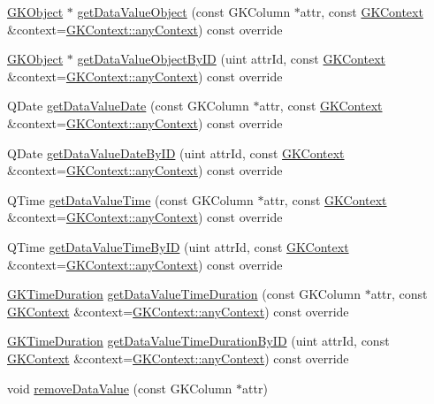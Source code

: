 \begin{DoxyCompactItemize}
\item 
\hyperlink{classGKObject}{G\+K\+Object} $\ast$ \hyperlink{classGKObject_a47e5fa225dbfce728bc1d45a9d742ab5}{get\+Data\+Value\+Object} (const G\+K\+Column $\ast$attr, const \hyperlink{classGKContext}{G\+K\+Context} \&context=\hyperlink{classGKContext_a37de2dc1b6bab087b9b92a445922e79d}{G\+K\+Context\+::any\+Context}) const override
\item 
\hyperlink{classGKObject}{G\+K\+Object} $\ast$ \hyperlink{classGKObject_a0107083f955e848f0e1af39f6a9e1263}{get\+Data\+Value\+Object\+By\+ID} (uint attr\+Id, const \hyperlink{classGKContext}{G\+K\+Context} \&context=\hyperlink{classGKContext_a37de2dc1b6bab087b9b92a445922e79d}{G\+K\+Context\+::any\+Context}) const override
\item 
Q\+Date \hyperlink{classGKObject_a89e18a58729aa19fc955ea56ca6d64e6}{get\+Data\+Value\+Date} (const G\+K\+Column $\ast$attr, const \hyperlink{classGKContext}{G\+K\+Context} \&context=\hyperlink{classGKContext_a37de2dc1b6bab087b9b92a445922e79d}{G\+K\+Context\+::any\+Context}) const override
\item 
Q\+Date \hyperlink{classGKObject_a16fd1ea80b037c2711afe5f481b05be0}{get\+Data\+Value\+Date\+By\+ID} (uint attr\+Id, const \hyperlink{classGKContext}{G\+K\+Context} \&context=\hyperlink{classGKContext_a37de2dc1b6bab087b9b92a445922e79d}{G\+K\+Context\+::any\+Context}) const override
\item 
Q\+Time \hyperlink{classGKObject_a5d819751b84c1070389f1de5272b2653}{get\+Data\+Value\+Time} (const G\+K\+Column $\ast$attr, const \hyperlink{classGKContext}{G\+K\+Context} \&context=\hyperlink{classGKContext_a37de2dc1b6bab087b9b92a445922e79d}{G\+K\+Context\+::any\+Context}) const override
\item 
Q\+Time \hyperlink{classGKObject_a5debfef84c5b0a056ea69808bb70bf38}{get\+Data\+Value\+Time\+By\+ID} (uint attr\+Id, const \hyperlink{classGKContext}{G\+K\+Context} \&context=\hyperlink{classGKContext_a37de2dc1b6bab087b9b92a445922e79d}{G\+K\+Context\+::any\+Context}) const override
\item 
\hyperlink{classGKTimeDuration}{G\+K\+Time\+Duration} \hyperlink{classGKObject_aff1ecee68193a30729f70ad5e1179e8b}{get\+Data\+Value\+Time\+Duration} (const G\+K\+Column $\ast$attr, const \hyperlink{classGKContext}{G\+K\+Context} \&context=\hyperlink{classGKContext_a37de2dc1b6bab087b9b92a445922e79d}{G\+K\+Context\+::any\+Context}) const override
\item 
\hyperlink{classGKTimeDuration}{G\+K\+Time\+Duration} \hyperlink{classGKObject_a2f659029f39e986a07632ee0ce85da9b}{get\+Data\+Value\+Time\+Duration\+By\+ID} (uint attr\+Id, const \hyperlink{classGKContext}{G\+K\+Context} \&context=\hyperlink{classGKContext_a37de2dc1b6bab087b9b92a445922e79d}{G\+K\+Context\+::any\+Context}) const override
\item 
void \hyperlink{classGKObject_a59b264f0a002944ee4baa42c9774c105}{remove\+Data\+Value} (const G\+K\+Column $\ast$attr)\hypertarget{classGKObject_a59b264f0a002944ee4baa42c9774c105}{}\label{classGKObject_a59b264f0a002944ee4baa42c9774c105}


\end{DoxyCompactItemize}
